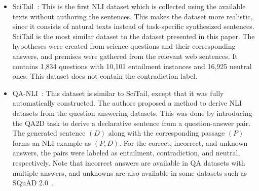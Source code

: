 \documentclass[preprint,12pt]{elsarticle}
\begin{document}
\begin{itemize}
    \item SciTail~\citep{khot2018scitail}: This is the first NLI dataset which is collected using the available texts without authoring the sentences. This makes the dataset more realistic, since it consists of natural texts instead of task-specific synthesized sentences. SciTail is the most similar dataset to the dataset presented in this paper. The hypotheses were created from science questions and their corresponding answers, and premises were gathered from the relevant web sentences. It contains 1,834 questions with 10,101 entailment instances and 16,925 neutral ones. This dataset does not contain the contradiction label. 
    \item QA-NLI~\citep{demszky2018transforming}: This dataset is similar to SciTail, except that it was fully automatically constructed. The authors proposed a method to derive NLI datasets from the question answering datasets. This was done by introducing the QA2D task to derive a declarative sentence from a question-answer pair. The generated sentence $(D)$ along with the corresponding passage $(P)$ forms an NLI example as $(P,D)$. For the correct, incorrect, and unknown answers, the pairs were labeled as entailment, contradiction, and neutral, respectively. Note that incorrect answers are available in QA datasets with multiple answers, and unknowns are also available in some datasets such as SQuAD 2.0~\citep{rajpurkar2018know}. 
\end{itemize}
\end{document}
